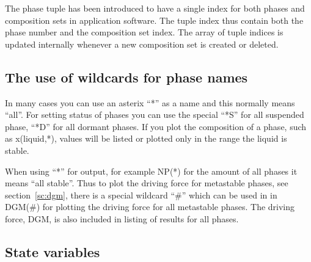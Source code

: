 \documentclass[11pt]{article}
\begin{document}
The phase tuple has been introduced to have a single index for both
phases and composition sets in application software.  The tuple index
thus contain both the phase number and the composition set index.  The
array of tuple indices is updated internally whenever a new
composition set is created or deleted.

\subsection{The use of wildcards for phase names}

In many cases you can use an asterix ``*'' as a name and this normally
means ``all''.  For setting status of phases you can use the special
``*S'' for all suspended phase, ``*D'' for all dormant phases.  If you
plot the composition of a phase, such as x(liquid,*), values will be
listed or plotted only in the range the liquid is stable.

When using ``*'' for output, for example NP(*) for the amount of all
phases it means ``all stable''.  Thus to plot the driving force for
metastable phases, see section~\ref{sc:dgm}, there is a special
wildcard ``\#'' which can be used in in DGM(\#) for plotting the driving
force for all metastable phases.  The driving force, DGM, is also
included in listing of results for all phases.

\hypertarget{Info statevariables}{}
\subsection{State variables}\label{sc:statevar}
\end{document}
